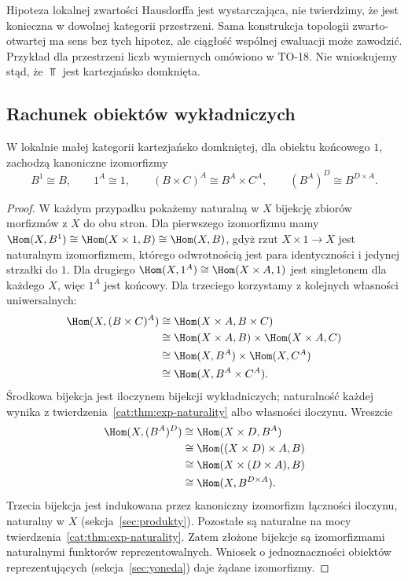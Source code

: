 \begin{uwaga}
Hipoteza lokalnej zwartości Hausdorffa jest wystarczająca, nie twierdzimy, że jest konieczna w dowolnej kategorii przestrzeni. Sama konstrukcja topologii zwarto-otwartej ma sens bez tych hipotez, ale ciągłość wspólnej ewaluacji może zawodzić. Przykład dla przestrzeni liczb wymiernych omówiono w TO-18. Nie wnioskujemy stąd, że $\Top$ jest kartezjańsko domknięta.
\end{uwaga}

\subsection{Rachunek obiektów wykładniczych}

\begin{stwierdzenie}\label{cat:prop:exp-laws}
W lokalnie małej kategorii kartezjańsko domkniętej, dla obiektu końcowego $1$, zachodzą kanoniczne izomorfizmy
\[
B^1\cong B,\qquad 1^A\cong 1,\qquad
(B\times C)^A\cong B^A\times C^A,\qquad
(B^A)^D\cong B^{D\times A}.
\]
\end{stwierdzenie}
\begin{proof}
W każdym przypadku pokażemy naturalną w $X$ bijekcję zbiorów morfizmów z $X$ do obu stron. Dla pierwszego izomorfizmu mamy
$\Hom(X,B^1)\cong\Hom(X\times1,B)\cong\Hom(X,B)$, gdyż rzut $X\times1\to X$ jest naturalnym izomorfizmem, którego odwrotnością jest para identyczności i jedynej strzałki do $1$.
Dla drugiego $\Hom(X,1^A)\cong\Hom(X\times A,1)$ jest singletonem dla każdego $X$, więc $1^A$ jest końcowy.
Dla trzeciego korzystamy z kolejnych własności uniwersalnych:
\[
\begin{aligned}
\Hom(X,(B\times C)^A)
&\cong\Hom(X\times A,B\times C)\\
&\cong\Hom(X\times A,B)\times\Hom(X\times A,C)\\
&\cong\Hom(X,B^A)\times\Hom(X,C^A)\\
&\cong\Hom(X,B^A\times C^A).
\end{aligned}
\]
Środkowa bijekcja jest iloczynem bijekcji wykładniczych; naturalność każdej wynika z twierdzenia~\ref{cat:thm:exp-naturality} albo własności iloczynu.
Wreszcie
\[
\begin{aligned}
\Hom(X,(B^A)^D)
&\cong\Hom(X\times D,B^A)\\
&\cong\Hom((X\times D)\times A,B)\\
&\cong\Hom(X\times(D\times A),B)\\
&\cong\Hom(X,B^{D\times A}).
\end{aligned}
\]
Trzecia bijekcja jest indukowana przez kanoniczny izomorfizm łączności iloczynu, naturalny w $X$ (sekcja~\ref{sec:produkty}). Pozostałe są naturalne na mocy twierdzenia~\ref{cat:thm:exp-naturality}. Zatem złożone bijekcje są izomorfizmami naturalnymi funktorów reprezentowalnych. Wniosek o jednoznaczności obiektów reprezentujących (sekcja~\ref{sec:yoneda}) daje żądane izomorfizmy.
\end{proof}
